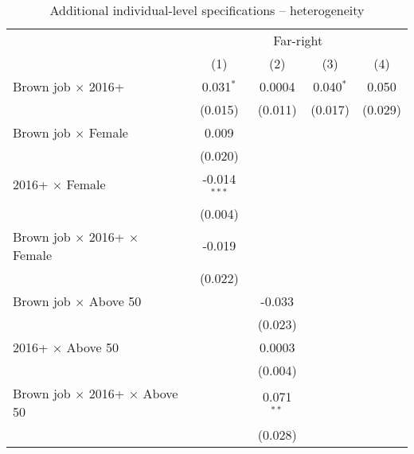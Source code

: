 \begin{table}[htbp]
   \caption{Additional individual-level specifications – heterogeneity}
   \centering
   \begin{tabular}{lcccc}
      \tabularnewline \midrule \midrule
       & \multicolumn{4}{c}{Far-right}\\
                                                      & (1)            & (2)          & (3)            & (4)\\  
      Brown job $\times$ 2016+                        & 0.031$^{*}$    & 0.0004       & 0.040$^{*}$    & 0.050\\   
                                                      & (0.015)        & (0.011)      & (0.017)        & (0.029)\\   
      Brown job $\times$ Female                       & 0.009          &              &                &   \\   
                                                      & (0.020)        &              &                &   \\   
      2016+ $\times$ Female                           & -0.014$^{***}$ &              &                &   \\   
                                                      & (0.004)        &              &                &   \\   
      Brown job $\times$ 2016+ $\times$ Female        & -0.019         &              &                &   \\   
                                                      & (0.022)        &              &                &   \\   
      Brown job $\times$ Above 50                     &                & -0.033       &                &   \\   
                                                      &                & (0.023)      &                &   \\   
      2016+ $\times$ Above 50                         &                & 0.0003       &                &   \\   
                                                      &                & (0.004)      &                &   \\   
      Brown job $\times$ 2016+ $\times$ Above 50      &                & 0.071$^{**}$ &                &   \\   
                                                      &                & (0.028)      &                &   \\   

\end{tabular}
\end{table}
